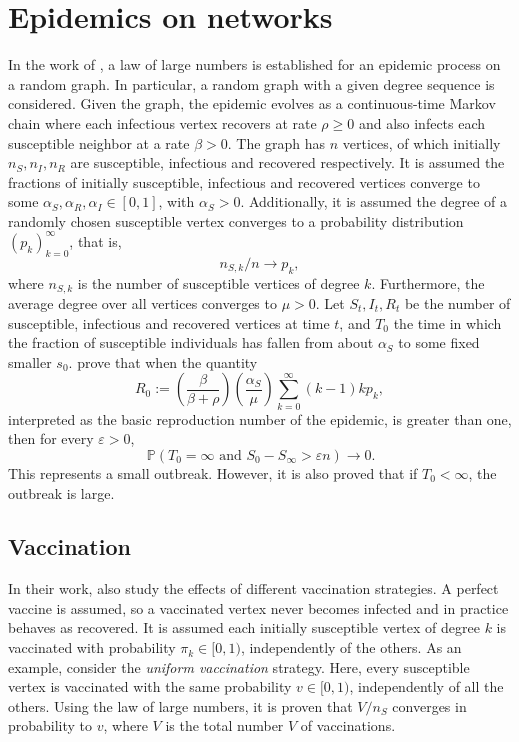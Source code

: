 \documentclass[letterpaper, 10 pt, conference]{article}
\newcommand\pr[1]{\, \mathbb{P} \left( #1 \right)}
\begin{document}
\section{Epidemics on networks}
In the work of \citet{janson2014law}, a law of large numbers is established for an epidemic process on a random graph. In particular, a random graph with a given degree sequence is considered. Given the graph, the epidemic evolves as a continuous-time Markov chain \citep{Liggett_2010} where each infectious vertex recovers at rate $\rho \geq 0$ and also infects each susceptible neighbor at a rate $\beta > 0$. The graph has $n$ vertices, of which initially $n_S, n_I, n_R$ are susceptible, infectious and recovered respectively. It is assumed the fractions of initially susceptible, infectious and recovered vertices converge to some $\alpha_S, \alpha_R, \alpha_I \in [0,1]$, with $\alpha_S > 0$. Additionally, it is assumed the degree of a randomly chosen susceptible vertex converges to a probability distribution $(p_k)_{k=0}^{\infty}$, that is, 
\begin{equation}
	n_{S,k} / n \rightarrow p_k,
\end{equation}
where $n_{S,k}$ is the number of susceptible vertices of degree $k$. Furthermore, the average degree over all vertices converges to $\mu > 0$. Let $S_t, I_t, R_t$ be the number of susceptible, infectious and recovered vertices at time $t$, and $T_0$ the time in which the fraction of susceptible individuals has fallen from about $\alpha_S$ to some fixed smaller $s_0$. \citet{janson2014law} prove that when the quantity
\begin{equation}
	R_0 := \left( \frac{\beta}{\beta + \rho}\right) \left( \frac{\alpha_S}{\mu} \right) \sum_{k = 0}^{\infty} (k-1) k p_k,
\end{equation}
interpreted as the basic reproduction number of the epidemic, is greater than one, then for every $\varepsilon > 0$,
\begin{equation}
	\pr{T_0 = \infty \text{ and } S_0 - S_\infty > \varepsilon n} \rightarrow 0.
\end{equation}
This represents a small outbreak. However, it is also proved that if $T_0 < \infty$, the outbreak is large.

\subsection{Vaccination}
In their work, \citet{janson2014law} also study the effects of different vaccination strategies. A perfect vaccine is assumed, so a vaccinated vertex never becomes infected and in practice behaves as recovered. It is assumed each initially susceptible vertex of degree $k$ is vaccinated with probability $\pi_k \in [0,1)$, independently of the others. As an example, consider the \textit{uniform vaccination} strategy. Here, every susceptible vertex is vaccinated with the same probability $v \in [0, 1)$, independently of all the others. Using the law of large numbers, it is proven that $V/n_S$ converges in probability to $v$, where $V$ is the total number $V$ of vaccinations. 


\end{document}
